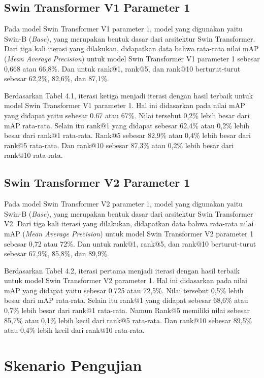 \subsection{Swin Transformer V1 Parameter 1}

Pada model Swin Transformer V1 parameter 1, model yang digunakan yaitu Swin-B (\emph{Base}), yang merupakan bentuk 
dasar dari arsitektur Swin Transformer. Dari tiga kali iterasi yang dilakukan, didapatkan data bahwa rata-rata nilai 
mAP (\emph{Mean Average Precision}) untuk model Swin Transformer V1 parameter 1 sebesar 0,668 atau 66,8\%. Dan untuk 
rank@1, rank@5, dan rank@10 berturut-turut sebesar 62,2\%, 82,6\%, dan 87,1\%. 

Berdasarkan Tabel 4.1, iterasi ketiga menjadi iterasi dengan hasil terbaik untuk model Swin Transformer V1 parameter 1. 
Hal ini didasarkan pada nilai mAP yang didapat yaitu sebesar 0.67 atau 67\%. Nilai tersebut 0,2\% lebih besar dari 
mAP rata-rata. Selain itu rank@1 yang didapat sebesar 62,4\% atau 0,2\% lebih besar dari rank@1 rata-rata. Rank@5 sebesar 
82,9\% atau 0,4\% lebih besar dari rank@5 rata-rata. Dan rank@10 sebesar 87,3\% atau 0,2\% lebih besar dari rank@10 
rata-rata.

\subsection{Swin Transformer V2 Parameter 1}

Pada model Swin Transformer V2 parameter 1, model yang digunakan yaitu Swin-B (\emph{Base}), yang merupakan bentuk 
dasar dari arsitektur Swin Transformer V2. Dari tiga kali iterasi yang dilakukan, didapatkan data bahwa rata-rata nilai 
mAP (\emph{Mean Average Precision}) untuk model Swin Transformer V2 parameter 1 sebesar 0,72 atau 72\%. Dan untuk 
rank@1, rank@5, dan rank@10 berturut-turut sebesar 67,9\%, 85,8\%, dan 89,9\%. 

Berdasarkan Tabel 4.2, iterasi pertama menjadi iterasi dengan hasil terbaik untuk model Swin Transformer V2 parameter 1. 
Hal ini didasarkan pada nilai mAP yang didapat yaitu sebesar 0.725 atau 72,5\%. Nilai tersebut 0,5\% lebih besar dari 
mAP rata-rata. Selain itu rank@1 yang didapat sebesar 68,6\% atau 0,7\% lebih besar dari rank@1 rata-rata. Namun 
Rank@5 memiliki nilai sebesar 85,7\% atau 0,1\% lebih kecil dari rank@5 rata-rata. Dan rank@10 sebesar 89,5\% atau 0,4\% 
lebih kecil dari rank@10 rata-rata.

\section{Skenario Pengujian}
\label{sec:skenariopengujian}

